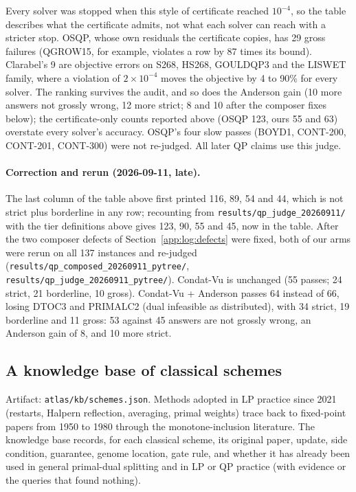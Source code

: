 Every solver was stopped when this style of certificate reached $10^{-4}$, so
the table describes what the certificate admits, not what each solver can
reach with a stricter stop. OSQP, whose own residuals the certificate copies,
has 29 gross failures (QGROW15, for example, violates a row by 87 times its
bound). Clarabel's 9 are objective errors on S268, HS268, GOULDQP3 and the
LISWET family, where a violation of $2\times10^{-4}$ moves the objective by 4 to
90\% for every solver. The ranking survives the audit, and so does the
Anderson gain (10 more answers not grossly wrong, 12 more strict; 8 and 10
after the composer fixes below); the
certificate-only counts reported above (OSQP 123, ours 55 and 63) overstate
every solver's accuracy. OSQP's four slow passes (BOYD1, CONT-200, CONT-201,
CONT-300) were not re-judged. All later QP claims use this judge.

\paragraph{Correction and rerun (2026-09-11, late).}
The last column of the table above first printed 116, 89, 54 and 44, which is
not strict plus borderline in any row; recounting from
\texttt{results/qp\_judge\_20260911/} with the tier definitions above gives 123,
90, 55 and 45, now in the table. After the two composer defects of
Section~\ref{app:log:defects} were fixed, both of our arms were rerun on all 137
instances and re-judged (\texttt{results/qp\_composed\_20260911\_pytree/},
\texttt{results/qp\_judge\_20260911\_pytree/}). Condat-Vu is unchanged (55 passes;
24 strict, 21 borderline, 10 gross). Condat-Vu + Anderson passes 64 instead of
66, losing DTOC3 and PRIMALC2 (dual infeasible as distributed), with 34 strict,
19 borderline and 11 gross: 53 against 45 answers are not grossly wrong, an
Anderson gain of 8, and 10 more strict.

\subsection{A knowledge base of classical schemes}
\label{app:log:kb}

Artifact: \texttt{atlas/kb/schemes.json}. Methods adopted in LP practice
since 2021 (restarts, Halpern reflection, averaging, primal weights) trace
back to fixed-point papers from 1950 to 1980 through the monotone-inclusion
literature. The knowledge base records, for each classical scheme, its
original paper, update, side condition, guarantee, genome location, gate
rule, and whether it has already been used in general primal-dual splitting
and in LP or QP practice (with evidence or the queries that found nothing).

